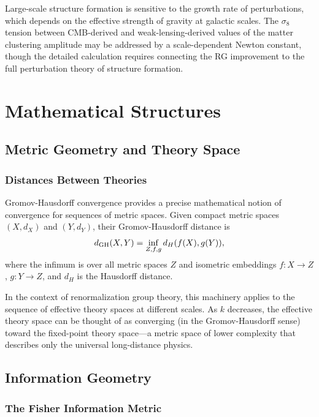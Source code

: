 \documentclass[12pt,a4paper,oneside]{book}
\theoremstyle{definition}
\theoremstyle{plain}
\theoremstyle{remark}
\begin{document}
Large-scale structure formation is sensitive to the growth rate of perturbations,
which depends on the effective strength of gravity at galactic scales. The
$\sigma_8$ tension between CMB-derived and weak-lensing-derived values of the
matter clustering amplitude may be addressed by a scale-dependent Newton
constant, though the detailed calculation requires connecting the RG
improvement to the full perturbation theory of structure formation.

\part{Mathematical Structures}

\chapter{Metric Geometry and Theory Space}

\section{Distances Between Theories}

Gromov-Hausdorff convergence provides a precise mathematical notion of
convergence for sequences of metric spaces. Given compact metric spaces
$(X, d_X)$ and $(Y, d_Y)$, their Gromov-Hausdorff distance is
\begin{equation}
d_{\rm GH}(X,Y) = \inf_{Z,f,g}d_H(f(X),g(Y)),
\end{equation}
where the infimum is over all metric spaces $Z$ and isometric embeddings
$f: X \to Z$, $g: Y \to Z$, and $d_H$ is the Hausdorff distance.

In the context of renormalization group theory, this machinery applies to the
sequence of effective theory spaces at different scales. As $k$ decreases,
the effective theory space can be thought of as converging (in the
Gromov-Hausdorff sense) toward the fixed-point theory space---a metric space
of lower complexity that describes only the universal long-distance physics.

\chapter{Information Geometry}

\section{The Fisher Information Metric}
\end{document}
